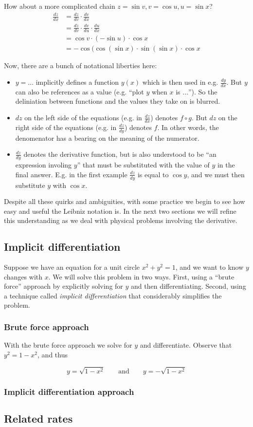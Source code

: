 How about a more complicated chain $z=\sin v, v=\cos u, u=\sin x$?
\begin{align*}
  \frac{dz}{dx}&=\frac{dz}{dv}\cdot \frac{dv}{dx}\\
               &=\frac{dz}{dv}\cdot \frac{dv}{du}\cdot \frac{du}{dx}\\
               &=\cos v \cdot (-\sin u)\cdot \cos x\\
               &=-\cos(\cos (\sin x)\cdot\sin (\sin x)\cdot \cos x
\end{align*}

Now, there are a bunch of notational liberties here:
\begin{itemize}
\item $y=\ldots$ implicitly defines a function $y(x)$ which is then used in
  e.g. $\frac{dy}{dx}$. But $y$ can also be references as a value
  (e.g. ``plot $y$ when $x$ is $\ldots$''). So the deliniation between
  functions and the values they take on is blurred.
\item $dz$ on the left side of the equations (e.g. in $\frac{dz}{dx}$)
  denotes $f\circ g$. But $dz$ on the right side of the equations (e.g. in
  $\frac{dz}{dy}$) denotes $f$. In other words, the denomenator has a
  bearing on the meaning of the numerator.
\item $\frac{dz}{dy}$ denotes the derivative function, but is also
  understood to be ``an expression involing $y$'' that must be
  substituted with the value of $y$ in the final answer. E.g. in the
  first example $\frac{dz}{dy}$ is equal to $\cos y$, and we must then
  substitute $y$ with $\cos x$.
\end{itemize}

Despite all these quirks and ambiguities, with some practice we begin
to see how easy and useful the Leibniz notation is. In the next two
sections we will refine this understanding as we deal with physical
problems involving the derivative.

\subsection{Implicit differentiation}
Suppose we have an equation for a unit circle $x^2+y^2=1$, and we want
to know $y$ changes with $x$. We will solve this problem in two ways.
First, using a ``brute force'' approach by explicitly solving for $y$
and then differentiating. Second, using a technique called
\textit{implicit differentiation} that considerably simplifies the
problem.

\subsubsection*{Brute force approach}
With the brute force approach we solve for $y$ and differentiate.
Observe that $y^2=1-x^2$, and thus

\[y=\sqrt{1-x^2}\qquad\text{and}\qquad y=-\sqrt{1-x^2}\]

\subsubsection*{Implicit differentiation approach}

\subsection{Related rates}


